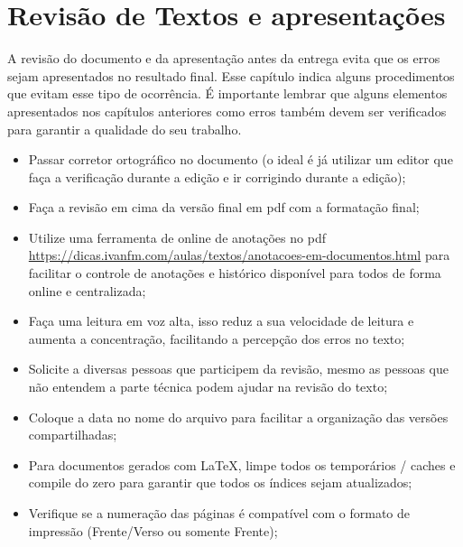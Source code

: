 \chapter{Revisão de Textos e apresentações}
\label{revisao-de-textos}


A revisão do documento e da apresentação antes da entrega evita que os erros sejam apresentados no resultado final. Esse capítulo indica alguns procedimentos que evitam esse tipo de ocorrência. É importante lembrar que alguns elementos apresentados nos capítulos anteriores como erros também devem ser verificados para garantir a qualidade do seu trabalho.

\begin{itemize}
    \item Passar corretor ortográfico no documento (o ideal é já utilizar um editor que faça a verificação durante a edição e ir corrigindo durante a edição);

    \item Faça a revisão em cima da versão final em \ac{pdf} com a formatação final;
    
    \item Utilize uma ferramenta de online de anotações no \ac{pdf} \url{https://dicas.ivanfm.com/aulas/textos/anotacoes-em-documentos.html} para facilitar o controle de anotações e histórico disponível para todos de forma online e centralizada;
    
    \item Faça uma leitura em voz alta, isso reduz a sua velocidade de leitura e aumenta a concentração, facilitando a percepção dos erros no texto;
    
    \item Solicite a diversas pessoas que participem da revisão, mesmo as pessoas que não entendem a parte técnica podem ajudar na revisão do texto;
    
    \item Coloque a data no nome do arquivo para facilitar a organização das versões compartilhadas;
    
    \item Para documentos gerados com \LaTeX, limpe todos os temporários / caches e compile do zero para garantir que todos os índices sejam atualizados;
    
    \item Verifique se a numeração das páginas é compatível com o formato de impressão (Frente/Verso ou somente Frente);
    

\end{itemize}
